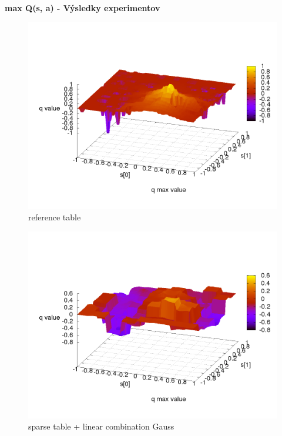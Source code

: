 \documentclass[xcolor=dvipsnames]{beamer}
\begin{document}
\begin{frame}{\bf max Q(s, a) - Výsledky experimentov}

\begin{minipage}{.5\textwidth}

\begin{figure}[!htb]
\centering
\includegraphics[scale=.2]{../../results_q_learning/map_2/function_type_0/iterations_10/q_learning_result.png}
\caption{reference table}
\end{figure}

\end{minipage}%
\begin{minipage}{.5\textwidth}

\begin{figure}[!htb]
\centering
\includegraphics[scale=.2]{../../results_q_learning/map_2/function_type_3/iterations_10/q_learning_result.png}
\caption{sparse table + linear combination Gauss}
\end{figure}


\end{minipage}
\end{frame}
\end{document}
